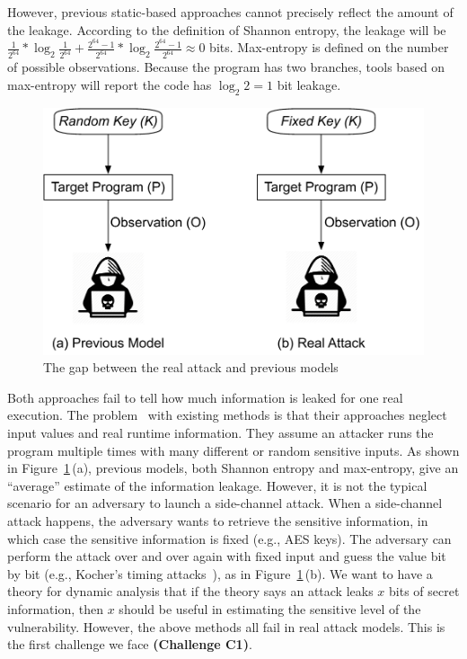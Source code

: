 However, previous static-based approaches cannot precisely reflect the amount of
the leakage. According to the definition of Shannon entropy, the leakage will be
$\frac{1}{2^{64}}*\log_{2}\frac{1}{2^{64}} + \frac{2^{64}-1}{2^{64}}
*\log_{2}\frac{2^{64}-1}{2^{64}} \approx 0$ bits. Max-entropy is defined on the
number of possible observations. Because the program has two
branches, tools based on max-entropy will report the code has $\log_2{2} = 1$
bit leakage.

\begin{figure}[h]
    \vspace*{-5pt}
    \centering
    \includegraphics[width=.65\columnwidth]{./figures/RA.pdf}
\vspace*{-2pt}
    \caption{The gap between the real attack and previous models}\label{fig:gap}
    \vspace*{-5pt}
\end{figure}

Both approaches fail to tell how much information is leaked for one real execution. 
The problem~\cite{Chattopadhyay:2017:QIL:3127041.3127044} with existing methods is that their approaches neglect input values and 
real runtime information. 
They assume an attacker runs the program multiple times with many different or 
random sensitive inputs. As
shown in Figure~\ref{fig:gap}\,(a), previous models, both Shannon entropy and max-entropy, 
give an ``average'' estimate of the information leakage. However, it is
not the typical scenario for an adversary to launch a side-channel attack. When
a side-channel attack happens, the adversary wants to retrieve the sensitive
information, in which case the sensitive information is fixed (e.g., AES keys).
The adversary can perform the attack over and over again with fixed input and 
guess the value bit by
bit (e.g., Kocher's timing attacks~\cite{kocher1996timing}), as in Figure~\ref{fig:gap}\,(b). 
We want to have a theory for dynamic analysis that if the theory says an attack leaks $x$ bits of
secret information, then $x$ should be useful in estimating the sensitive level of the vulnerability. 
However, the above methods all fail in real attack models. This is the first challenge we face
\textbf{(Challenge C1)}.

